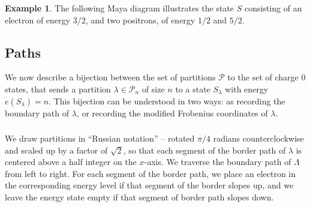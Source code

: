 \documentclass{amsart}[12pt]
\theoremstyle{definition}
\newtheorem{example}[dummy]{Example}
\begin{document}
\begin{example} \label{ex:particles}
The following Maya diagram illustrates the state $S$ consisting of an
electron of energy $3/2$, and two positrons, of energy $1/2$ and
$5/2$.

\begin{center}
\end{center}
\end{example}


\subsection{Paths}

We now describe a bijection between the set of partitions $\mathcal{P}$ to the
set of charge 0 states, that sends a partition
$\lambda\in\mathcal{P}_n$ of size $n$ to a state $S_\lambda$ with
energy $e(S_\lambda)=n$.  This bijection can be understood in two ways:
as recording the boundary path of $\lambda$, or recording the modified
Frobenius coordinates of $\lambda$.


\subsubsection{}
We draw partitions in ``Russian
notation'' -- rotated $\pi/4$ radians counterclockwise and scaled up
by a factor of $\sqrt{2}$, so that each segment of the border path of
$\lambda$ is centered above a half integer on the $x$-axis.  We traverse the boundary path of $\Lambda$ from left to right.  For each segment of the border path, we place an electron in the corresponding energy level if that segment of the border slopes up, and we leave the energy state empty if that segment of border path slopes down.
\end{document}

